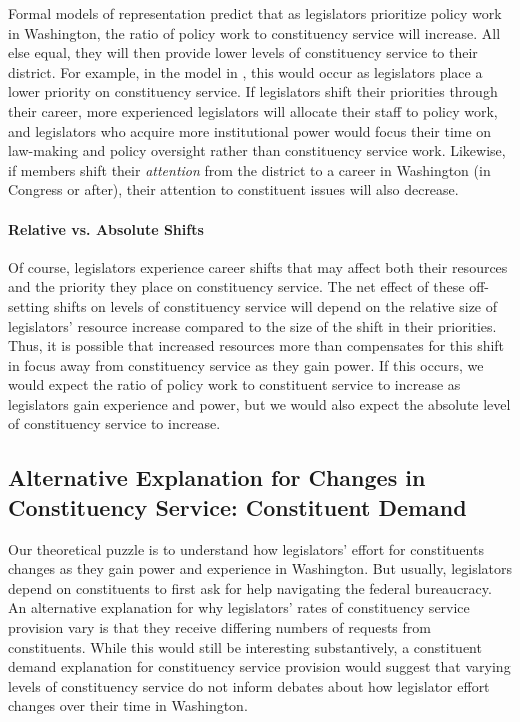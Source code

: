 \documentclass[12pt]{article}
\begin{document}
Formal models of representation predict that as legislators prioritize policy work in Washington, the ratio of policy work to constituency service will increase. All else equal, they will then provide lower levels of constituency service to their district. For example, in the model in \cite{AshworthBuenodeMesquita2006}, this would occur as legislators place a lower priority on constituency service. If legislators shift their priorities through their career, more experienced legislators will allocate their staff to policy work, and legislators who acquire more institutional power would focus their time on law-making and policy oversight rather than constituency service work. Likewise, if members shift their \textit{attention} from the district to a career in Washington (in Congress or after), their attention to constituent issues will also decrease. 


\paragraph{Relative vs. Absolute Shifts} Of course, legislators experience career shifts that may affect both their resources and the priority they place on constituency service. The net effect of these off-setting shifts on levels of constituency service will depend on the relative size of legislators' resource increase compared to the size of the shift in their priorities. Thus, it is possible that increased resources more than compensates for this shift in focus away from constituency service as they gain power.
If this occurs, we would expect the ratio of policy work to constituent service to increase as legislators gain experience and power, but we would also expect the absolute level of constituency service to increase.


\subsection{Alternative Explanation for Changes in Constituency Service: Constituent Demand}

Our theoretical puzzle is to understand how legislators' effort for constituents changes as they gain power and experience in Washington. But usually, legislators depend on constituents to first ask for help navigating the federal bureaucracy. An alternative explanation for why legislators' rates of constituency service provision vary is that they receive differing numbers of requests from constituents. While this would still be interesting substantively, a constituent demand explanation for constituency service provision would suggest that varying levels of constituency service do not inform debates about how legislator effort changes over their time in Washington. 
\end{document}
